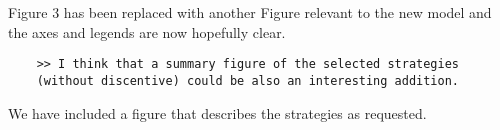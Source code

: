 \documentclass[10pt]{article}
\begin{document}
Figure 3 has been replaced with another Figure relevant to the new model and the
axes and legends are now hopefully clear.

\begin{verbatim}
    >> I think that a summary figure of the selected strategies
    (without discentive) could be also an interesting addition.
\end{verbatim}

We have included a figure that describes the strategies as requested.
\end{document}

